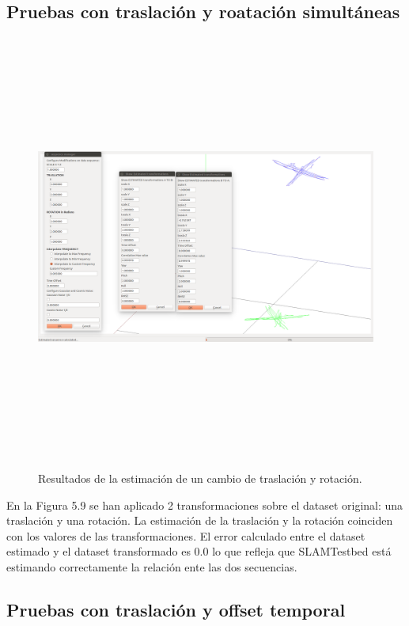 \subsection{Pruebas con traslación y roatación simultáneas}
\begin{figure}[H]
\begin{center}
\label{fig:opciones de View}\includegraphics[height=14.0cm,width=18.0cm]{img/cap6/Trasla_Rota_abba.png}
\hspace{0.5cm}

\end{center}

\caption{Resultados de la estimación de un cambio de traslación y rotación.}
\end{figure}

En la Figura 5.9 se han aplicado 2 transformaciones sobre el dataset original: una traslación y una rotación.
La estimación de la traslación y la rotación coinciden con los valores de las transformaciones. El error calculado entre el dataset estimado y el dataset transformado es 0.0 lo que refleja que SLAMTestbed está estimando correctamente la relación ente las dos secuencias.

\subsection{Pruebas con traslación y offset temporal}

